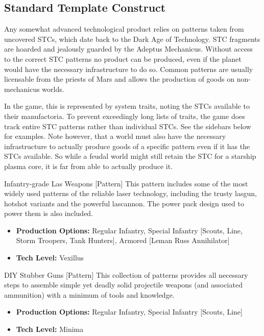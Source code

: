 \subsection{Standard Template Construct}
Any somewhat advanced technological product relies on patterns taken from uncovered STCs, which date back to the Dark Age of Technology. STC fragments are hoarded and jealously guarded by the Adeptus Mechanicus. Without access to the correct STC patterns no product can be produced, even if the planet would have the necessary infrastructure to do so. 
Common patterns are usually licensable from the priests of Mars and allows the production of goods on non-mechanicus worlds.

In the game, this is represented by system traits, noting the STCs available to their manufactoria. To prevent exceedingly long lists of traits, the game does track entire STC patterns rather than individual STCs. See the sidebars below for examples. Note however, that a world must also have the necessary infrastructure to actually produce goods of a specific pattern even if it has the STCs available. So while a feudal world might still retain the STC for a starship plasma core, it is far from able to actually produce it.

\begin{DndSidebar}{Infantry-grade Las Weapons [Pattern]}
This pattern includes some of the most widely used patterns of the reliable laser technology, including the trusty lasgun, hotshot variants and the powerful lascannon. The power pack design used to power them is also included.
 \begin{itemize}
 	\item \textbf{Production Options:} Regular Infantry, Special Infantry [Scouts, Line, Storm Troopers, Tank Hunters], Armored [Leman Russ Annihilator]
 	\item \textbf{Tech Level:} Vexillus
 \end{itemize}
\end{DndSidebar}

\begin{DndSidebar}{DIY Stubber Guns [Pattern]}
This collection of patterns provides all necessary steps to assemble simple yet deadly solid projectile weapons (and associated ammunition) with a minimum of tools and knowledge.
 \begin{itemize}
 	\item \textbf{Production Options:} Regular Infantry, Special Infantry [Scouts, Line]
 	\item \textbf{Tech Level:} Minima
 \end{itemize}
\end{DndSidebar}


